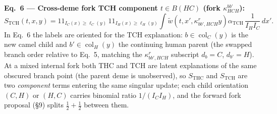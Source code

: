 \documentclass[11pt]{article}
\newcommand{\col}{\operatorname{col}}
\newcommand{\ind}{1\!\!1}
\newcommand{\rw}{\widetilde{w}}  %
\theoremstyle{plain}
\begin{document}
\textbf{Eq.~6 --- Cross-deme fork TCH component $t\in B(HC)$ (fork $\kappa^{bb'}_{HCH}$):}
\begin{equation}
S_{\mathrm{TCH}}(t,x,y)=\ind_{I_C(x)\ge\ell_C(y)}\,\ind_{I_H(x)\ge\ell_H(y)}\int \rw\!\left(t,x',\kappa^r_{bb',HCH}y\right)\alpha_{\mathrm{TCH}}\,
\frac{1}{I_HI_C}\,dx'.
\end{equation}
In Eq.~6 the labels are oriented for the TCH explanation: $b\in\col_C(y)$ is the new camel child and
$b'\in\col_H(y)$ the continuing human parent (the swapped branch order relative to Eq.~5, matching the
$\kappa^r_{bb',HCH}$ subscript $d_b=C$, $d_{b'}=H$).
At a mixed internal fork both THC and TCH are latent explanations of the same obscured branch point
(the parent deme is unobserved), so $S_{\mathrm{THC}}$ and $S_{\mathrm{TCH}}$ are two \emph{component}
terms entering the same singular update; each child orientation $(C,H)$ or $(H,C)$ carries binomial
ratio $1/(I_CI_H)$, and the forward fork proposal (\S9) splits $\tfrac12{+}\tfrac12$ between them.
\end{document}
